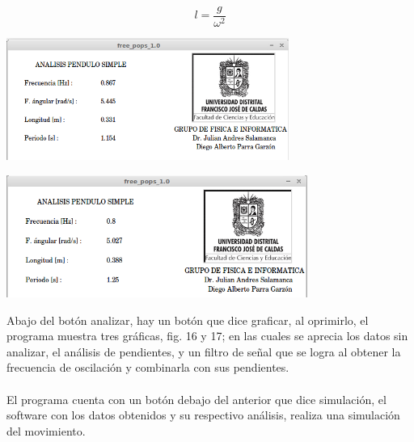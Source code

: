 \documentclass[12pt]{article}
\newenvironment{Figure}
{\par\medskip\noindent\minipage{\linewidth}}
{\endminipage\par\medskip}
\begin{document}
\begin{multicols}{2}
\begin{equation}
\label{eqn:longitud}
 l = \frac{g}{\omega^2}  
\end{equation}

\begin{Figure}
\center
\includegraphics[width=9.cm, height=4cm]{fig/analis1.png}
\label{fig:g14}
\end{Figure}

\begin{Figure}
\center
\includegraphics[width=9.cm, height=4cm]{fig/analis2.png}
\label{fig:g15}
\end{Figure}

Abajo del botón analizar, hay un botón que dice graficar, al oprimirlo, el programa muestra tres gráficas, fig. 16 y 17; en las cuales se aprecia los datos sin analizar, el análisis de pendientes, y un filtro de señal que se logra al obtener la frecuencia de oscilación y combinarla con sus  pendientes. 
\\ \\
El programa cuenta con un botón debajo del anterior que dice simulación, el software con los datos obtenidos y su respectivo análisis, realiza una simulación\cite{VISUAL}  del movimiento.


\end{multicols}
\end{document}
